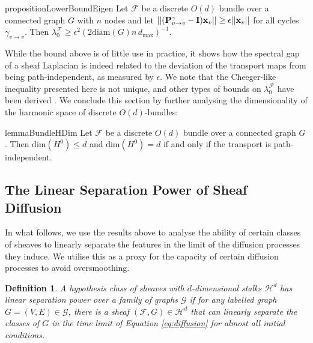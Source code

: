 \documentclass{article}
\newtheorem{definition}[theorem]{Definition}
\def\eps{{\epsilon}}
\def\vx{{\bf{x}}}
\def\mI{{\bf{I}}}
\def\mP{{\bf{P}}}
\def\gF{{\mathcal{F}}}
\def\gG{{\mathcal{G}}}
\def\gH{{\mathcal{H}}}
\begin{document}
\begin{restatable}{proposition}{LowerBoundEigen}\label{prop:lower_bound_eigen}
Let $\mathcal{F}$ be a discrete $O(d)$ bundle over a connected graph $G$ with $n$ nodes and let $\lvert \lvert (\mP_{v\rightarrow v}^{\gamma} - \mI)\vx_v\rvert\rvert \geq \eps \lvert\lvert \vx_v\rvert\rvert$ for all cycles $\gamma_{v\rightarrow v}$. Then 
$\lambda_{0}^{\mathcal{F}} \geq \eps^{2} (2\mathrm{diam}(G) n\,d_{\text{max}})^{-1}$.
\end{restatable}
While the bound above is of little use in practice, it shows how the spectral gap of a sheaf Laplacian is indeed related to the deviation of the transport maps from being path-independent, as measured by $\eps$. We note that the Cheeger-like inequality presented here is not unique, and other types of bounds on $\lambda_0^{\gF}$ have been derived \citep{bandeira2013cheeger}.  
We conclude this section by further analysing the dimensionality of the harmonic space of discrete $O(d)$-bundles:

\begin{restatable}{lemma}{BundleHDim}\label{lemma:bundle_h0_dim}
Let $\gF$ be a discrete $O(d)$ bundle over a connected graph $G$. Then $\mathrm{dim}(H^0) \leq d$ and $\mathrm{dim}(H^{0}) = d$ if and only if the transport is path-independent. 
\end{restatable}





\subsection{The Linear Separation Power of Sheaf Diffusion}\label{sec:diffusion_power}

In what follows, we use the results above to analyse the ability of certain classes of sheaves to linearly separate the features in the limit of the diffusion processes they induce. We utilise this as a proxy for the capacity of certain diffusion processes to avoid oversmoothing.  

\begin{definition}
A hypothesis class of sheaves with $d$-dimensional stalks $\gH^d$ has {\em linear separation power} over a family of graphs $\gG$ if for any labelled graph $G = (V, E) \in \gG$, there is a sheaf $(\gF, G) \in \gH^d$ that can linearly separate the classes of $G$ in the time limit of Equation \ref{eq:diffusion} for 
almost all initial conditions. 
\end{definition}
\end{document}
